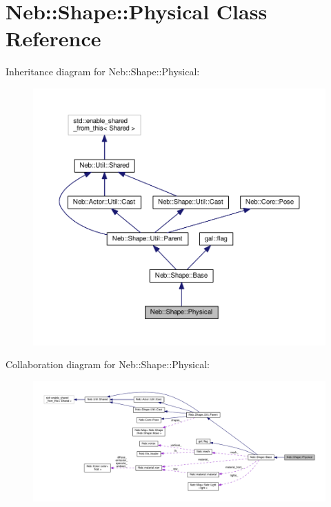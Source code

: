 \hypertarget{classNeb_1_1Shape_1_1Physical}{\section{Neb\-:\-:Shape\-:\-:Physical Class Reference}
\label{classNeb_1_1Shape_1_1Physical}
}


Inheritance diagram for Neb\-:\-:Shape\-:\-:Physical\-:
\nopagebreak
\begin{figure}[H]
\begin{center}
\leavevmode
\includegraphics[width=350pt]{classNeb_1_1Shape_1_1Physical__inherit__graph}
\end{center}
\end{figure}


Collaboration diagram for Neb\-:\-:Shape\-:\-:Physical\-:
\nopagebreak
\begin{figure}[H]
\begin{center}
\leavevmode
\includegraphics[width=350pt]{classNeb_1_1Shape_1_1Physical__coll__graph}
\end{center}
\end{figure}
